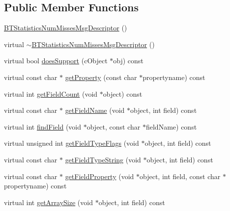 \subsection*{Public Member Functions}
\begin{DoxyCompactItemize}
\item 
\hyperlink{classBTStatisticsNumMissesMsgDescriptor_aaa972febe245f79b6e788cd7d0b5fdf2}{B\+T\+Statistics\+Num\+Misses\+Msg\+Descriptor} ()
\item 
virtual \hyperlink{classBTStatisticsNumMissesMsgDescriptor_a92f7ab314eee897bc0e75ddadc19d467}{$\sim$\+B\+T\+Statistics\+Num\+Misses\+Msg\+Descriptor} ()
\item 
virtual bool \hyperlink{classBTStatisticsNumMissesMsgDescriptor_ac8a7c65e6a0f79482dcd0de7085577f5}{does\+Support} (c\+Object $\ast$obj) const 
\item 
virtual const char $\ast$ \hyperlink{classBTStatisticsNumMissesMsgDescriptor_afa165de4d7c72b01217538f5874960ef}{get\+Property} (const char $\ast$propertyname) const 
\item 
virtual int \hyperlink{classBTStatisticsNumMissesMsgDescriptor_ae4ff1f44f80e3368327a600616fc8376}{get\+Field\+Count} (void $\ast$object) const 
\item 
virtual const char $\ast$ \hyperlink{classBTStatisticsNumMissesMsgDescriptor_a0f7c21671d15111f2a0767a2539d20be}{get\+Field\+Name} (void $\ast$object, int field) const 
\item 
virtual int \hyperlink{classBTStatisticsNumMissesMsgDescriptor_a339cda8138d4faad0dad36ce6a6e9dd4}{find\+Field} (void $\ast$object, const char $\ast$field\+Name) const 
\item 
virtual unsigned int \hyperlink{classBTStatisticsNumMissesMsgDescriptor_a138c2af9086b5c94bdd853f7556760ac}{get\+Field\+Type\+Flags} (void $\ast$object, int field) const 
\item 
virtual const char $\ast$ \hyperlink{classBTStatisticsNumMissesMsgDescriptor_af25a045e9900358a0c1cb7f4e8ad2ee9}{get\+Field\+Type\+String} (void $\ast$object, int field) const 
\item 
virtual const char $\ast$ \hyperlink{classBTStatisticsNumMissesMsgDescriptor_a7ff6df5fa866210f4b0ef04794f896be}{get\+Field\+Property} (void $\ast$object, int field, const char $\ast$propertyname) const 
\item 
virtual int \hyperlink{classBTStatisticsNumMissesMsgDescriptor_ac6513df57f60b2ed271dbe935a5cc31b}{get\+Array\+Size} (void $\ast$object, int field) const 
\item 

\end{DoxyCompactItemize}
